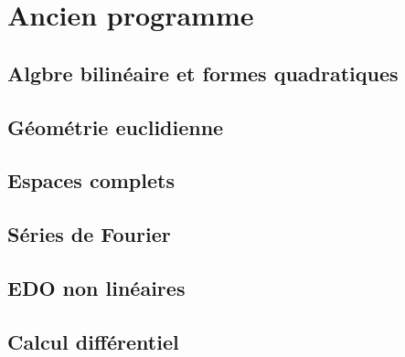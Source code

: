 \chapter{Ancien programme}

% 
% 
% 
% 
% 
% 
% 



\section{Algbre bilin\'eaire et formes quadratiques}


\section{G\'eom\'etrie euclidienne}


\section{Espaces complets}


\section{S\'eries de Fourier}


\section{EDO non lin\'eaires}


\section{Calcul diff\'erentiel}




